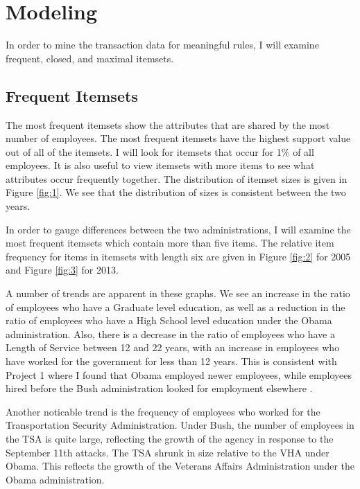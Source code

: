 \documentclass{article}
\begin{document}
\section{Modeling}
In order to mine the transaction data for meaningful rules, I will examine frequent, closed, and maximal itemsets.

    \subsection{Frequent Itemsets}
    The most frequent itemsets show the attributes that are shared by the most number of employees. The most frequent itemsets have the highest support value out of all of the itemsets. I will look for itemsets that occur for 1\% of all employees. It is also useful to view itemsets with more items to see what attributes occur frequently together. The distribution of itemset sizes is given in Figure \ref{fig:1}. We see that the distribution of sizes is consistent between the two years.
    \par
    In order to gauge differences between the two administrations, I will examine the most frequent itemsets which contain more than five items. The relative item frequency for items in itemsets with length six are given in Figure \ref{fig:2} for 2005 and Figure \ref{fig:3} for 2013.
    \par
    A number of trends are apparent in these graphs. We see an increase in the ratio of employees who have a Graduate level education, as well as a reduction in the ratio of employees who have a High School level education under the Obama administration.  Also, there is a decrease in the ratio of employees who have a Length of Service between 12 and 22 years, with an increase in employees who have worked for the government for less than 12 years. This is consistent with Project 1 where I found that Obama employed newer employees, while employees hired before the Bush administration looked for employment elsewhere \cite{proj1}.
    \par
    Another noticable trend is the frequency of employees who worked for the Transportation Security Administration. Under Bush, the number of employees in the TSA is quite large, reflecting the growth of the agency in response to the September 11th attacks. The TSA shrunk in size relative to the VHA under Obama. This reflects the growth of the Veterans Affairs Administration under the Obama administration.
    \par
\end{document}
